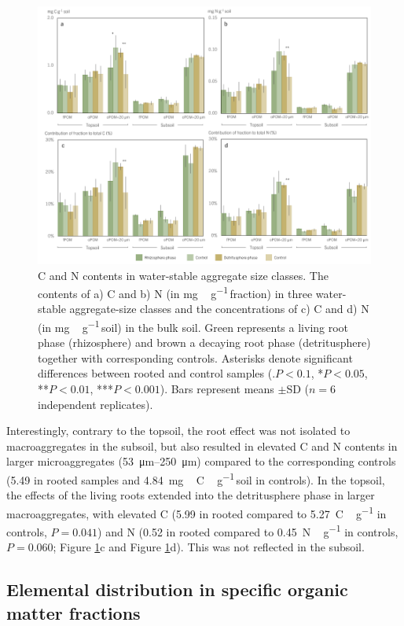 \begin{figure}[H]
	\centering
	\includegraphics[width=1\textwidth]{img/M5-Figure_1.png}
	\caption{C and N contents in water-stable aggregate size classes. The contents of a) C and b) N (in \si{mg\,\gram^{-1}}\,fraction) in three water-stable aggregate-size classes and the concentrations of c) C and d) N (in \si{mg\,\gram^{-1}}\,soil) in the bulk soil. Green represents a living root phase (rhizosphere) and brown a decaying root phase (detritusphere) together with corresponding controls. Asterisks denote significant differences between rooted and control samples (\(.P < 0.1\), *\(P < 0.05\), **\(P < 0.01\), ***\(P < 0.001\)). Bars represent means \(\pm\)SD (\(n=6\) independent replicates).}
	\label{fig:M5-F1}
\end{figure}

Interestingly, contrary to the topsoil, the root effect was not isolated to macroaggregates in the subsoil, but also resulted in elevated C and N contents in larger microaggregates (\SIrange{53}{250}{\micro\metre}) compared to the corresponding controls (\num{5.49} in rooted samples and \SI{4.84}{mg\,C\,\gram^{-1}}\,soil in controls). In the topsoil, the effects of the living roots extended into the detritusphere phase in larger macroaggregates, with elevated C (\num{5.99} in rooted compared to \SI{5.27}{C\,\gram^{-1}} in controls, \(P=0.041\)) and N (\num{0.52} in rooted compared to \SI{0.45}{N\,\gram^{-1}} in controls, \(P=0.060\); Figure \ref{fig:M5-F1}c and Figure \ref{fig:M5-F1}d). This was not reflected in the subsoil.

\subsection{Elemental distribution in specific organic matter fractions}

